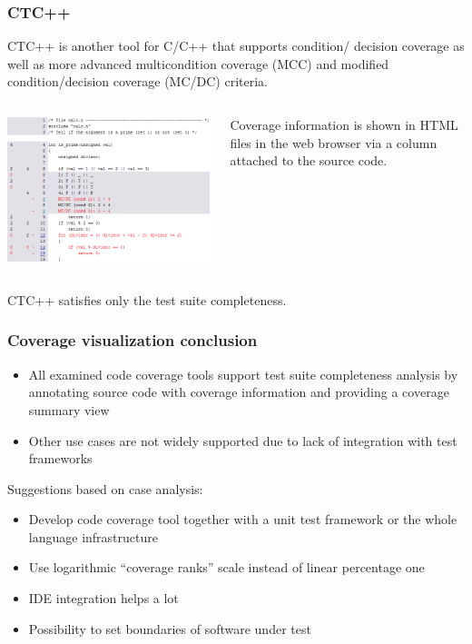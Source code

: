 \documentclass{beamer}
\begin{document}
\begin{frame}
  \frametitle{CTC++}
CTC++ is another tool for C/C++ that  supports condition/ decision coverage as well as 
more advanced multicondition coverage (MCC) and modified condition/decision coverage (MC/DC) criteria.
\begin{columns}[T]
\begin{column}{.6\textwidth}
   \hfill
    \includegraphics[scale=0.4]{ctc_source.png}
\end{column}
\begin{column}{.3\textwidth}
Coverage information is shown in HTML files in the web browser via a column attached to the source code.
\end{column}
\end{columns}
CTC++ satisfies only the test suite completeness.
\end{frame}

\begin{frame}
  \frametitle{Coverage visualization conclusion}
\begin{itemize}
  \item All examined code coverage tools support test suite completeness analysis by annotating source code with coverage information and providing a coverage summary view
  \item Other use cases are not widely supported due to lack of integration with test frameworks
\end{itemize}
Suggestions based on case analysis:
\begin{itemize}
  \item Develop code coverage tool together with a unit test framework or the whole language infrastructure 
  \item Use logarithmic “coverage ranks” scale instead of linear percentage one
  \item IDE integration helps a lot
  \item Possibility to set  boundaries of software under test
\end{itemize}
\end{frame}
\end{document}
